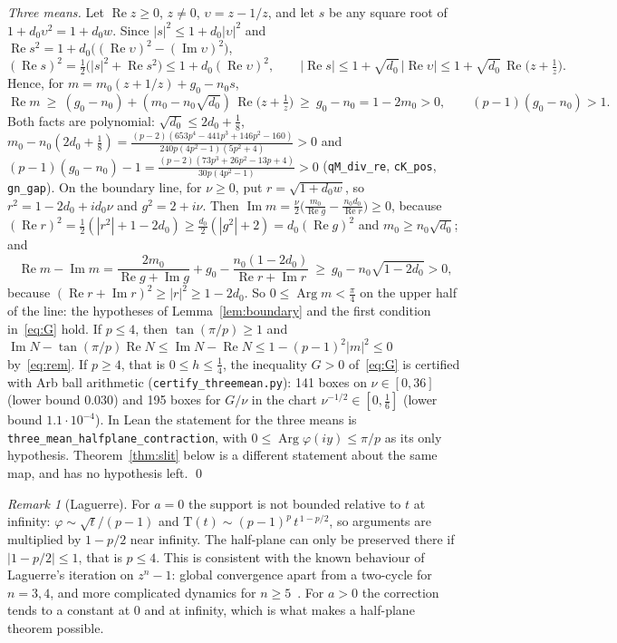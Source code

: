 \documentclass[10pt,a4paper]{article}
\theoremstyle{plain}
\theoremstyle{remark}
\newtheorem{remark}[theorem]{Remark}
\numberwithin{equation}{section}
\newcommand{\Tm}{\mathrm{T}}
\DeclareMathOperator{\re}{Re}\DeclareMathOperator{\im}{Im}
\DeclareMathOperator{\Arg}{Arg}\DeclareMathOperator{\Log}{Log}
\newcommand{\lean}[1]{\texttt{#1}}
\begin{document}
\emph{Three means.} Let $\re z\ge0$, $z\ne0$, $\upsilon=z-1/z$, and let $s$ be any square root of
$1+d_0\upsilon^{2}=1+d_0w$. Since $|s|^{2}\le1+d_0|\upsilon|^{2}$ and
$\re s^{2}=1+d_0\bigl((\re\upsilon)^{2}-(\im\upsilon)^{2}\bigr)$,
\[
 (\re s)^{2}=\tfrac12\bigl(|s|^{2}+\re s^{2}\bigr)\le1+d_0(\re\upsilon)^{2},\qquad
 |\re s|\le1+\sqrt{d_0}\,|\re\upsilon|\le1+\sqrt{d_0}\,\re\bigl(z+\tfrac1z\bigr).
\]
Hence, for $m=m_0(z+1/z)+g_0-n_0s$,
\begin{equation}\label{eq:rem}
 \re m\ \ge\ (g_0-n_0)+(m_0-n_0\sqrt{d_0})\,\re\bigl(z+\tfrac1z\bigr)\ \ge\ g_0-n_0=1-2m_0>0,
 \qquad (p-1)(g_0-n_0)>1 .
\end{equation}
Both facts are polynomial: $\sqrt{d_0}\le2d_0+\frac18$,
$m_0-n_0(2d_0+\frac18)=\frac{(p-2)(653p^{4}-441p^{3}+146p^{2}-160)}{240p(4p^{2}-1)(5p^{2}+4)}>0$ and
$(p-1)(g_0-n_0)-1=\frac{(p-2)(73p^{3}+26p^{2}-13p+4)}{30p(4p^{2}-1)}>0$
(\lean{qM\_div\_re}, \lean{cK\_pos}, \lean{gn\_gap}). On the boundary line, for $\nu\ge0$, put
$r=\sqrt{1+d_0w}$, so $r^{2}=1-2d_0+id_0\nu$ and $g^{2}=2+i\nu$. Then
$\im m=\frac\nu2\bigl(\frac{m_0}{\re g}-\frac{n_0d_0}{\re r}\bigr)\ge0$, because
$(\re r)^{2}=\frac12(|r^{2}|+1-2d_0)\ge\frac{d_0}2(|g^{2}|+2)=d_0(\re g)^{2}$ and
$m_0\ge n_0\sqrt{d_0}$; and
\[
 \re m-\im m=\frac{2m_0}{\re g+\im g}+g_0-\frac{n_0(1-2d_0)}{\re r+\im r}\ \ge\ g_0-n_0\sqrt{1-2d_0}>0,
\]
because $(\re r+\im r)^{2}\ge|r|^{2}\ge1-2d_0$. So $0\le\Arg m<\frac\pi4$ on the upper half of the
line: the hypotheses of Lemma~\ref{lem:boundary} and the first condition in~\eqref{eq:G} hold. If
$p\le4$, then $\tan(\pi/p)\ge1$ and
$\im N-\tan(\pi/p)\re N\le\im N-\re N\le1-(p-1)^{2}|m|^{2}\le0$ by~\eqref{eq:rem}. If $p\ge4$, that
is $0\le h\le\frac14$, the inequality $G>0$ of~\eqref{eq:G} is certified with Arb ball arithmetic
(\texttt{certify\_threemean.py}): 141 boxes on $\nu\in[0,36]$ (lower bound $0.030$) and 195 boxes
for $G/\nu$ in the chart $\nu^{-1/2}\in[0,\frac16]$ (lower bound $1.1\cdot10^{-4}$). In Lean the
statement for the three means is \lean{three\_mean\_halfplane\_contraction}, with
$0\le\Arg\varphi(iy)\le\pi/p$ as its only hypothesis. Theorem~\ref{thm:slit} below is a different
statement about the same map, and has no hypothesis left.
\qed

\begin{remark}[Laguerre]\label{rem:laguerre}
For $a=0$ the support is not bounded relative to $t$ at infinity: $\varphi\sim\sqrt t/(p-1)$ and
$\Tm(t)\sim(p-1)^{p}\,t^{\,1-p/2}$, so arguments are multiplied by $1-p/2$ near infinity. The
half-plane can only be preserved there if $|1-p/2|\le1$, that is $p\le4$. This is consistent with
the known behaviour of Laguerre's iteration on $z^{n}-1$: global convergence apart from a two-cycle
for $n=3,4$, and more complicated dynamics for $n\ge5$~\cite{curry,belik}. For $a>0$ the correction
tends to a constant at $0$ and at infinity, which is what makes a half-plane theorem possible.
\end{remark}
\end{document}
